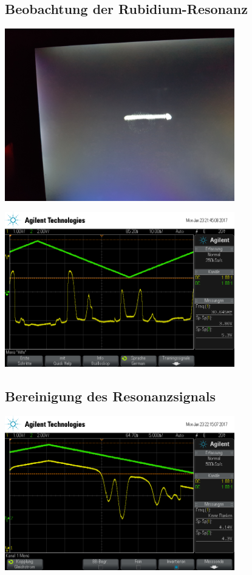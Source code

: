 \documentclass[captions=tableheading]{scrartcl}
\begin{document}
\subsection{Beobachtung der Rubidium-Resonanz}

\begin{center}
	\includegraphics[width=10cm]{images/resonanz_bild.jpg}
	\label{fig:resonanzbild}
\end{center}

\begin{center}
	\includegraphics[width=10cm]{images/scope_22.png}
	\label{fig:resonanz}
\end{center}

\subsection{Bereinigung des Resonanzsignals}

\begin{center}
	\includegraphics[width=10cm]{images/resonanz.png}
	\label{fig:resonanzlinien}
\end{center}
\end{document}
